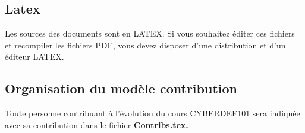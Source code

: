 \subsection{Latex}

Les sources des documents sont en LATEX. Si vous souhaitez éditer ces fichiers et recompiler les fichiers PDF, vous devez disposer d'une distribution et d'un éditeur LATEX.




\subsection{Organisation du modèle contribution}

Toute personne contribuant à l'évolution du cours CYBERDEF101 sera indiquée avec sa contribution dans le fichier \bf{Contribs.tex}.

